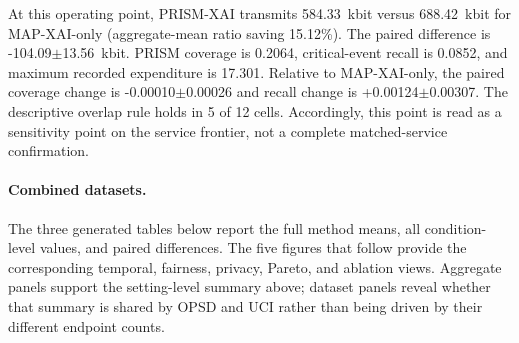 At this operating point, PRISM-XAI transmits 584.33~kbit versus 688.42~kbit for MAP-XAI-only (aggregate-mean ratio saving 15.12\%). The paired difference is -104.09$\pm$13.56~kbit. PRISM coverage is 0.2064, critical-event recall is 0.0852, and maximum recorded expenditure is 17.301. Relative to MAP-XAI-only, the paired coverage change is -0.00010$\pm$0.00026 and recall change is +0.00124$\pm$0.00307. The descriptive overlap rule holds in 5 of 12 cells. Accordingly, this point is read as a sensitivity point on the service frontier, not a complete matched-service confirmation.

\paragraph{Combined datasets.} The three generated tables below report the full method means, all condition-level values, and paired differences. The five figures that follow provide the corresponding temporal, fairness, privacy, Pareto, and ablation views. Aggregate panels support the setting-level summary above; dataset panels reveal whether that summary is shared by OPSD and UCI rather than being driven by their different endpoint counts.

\begin{table}[p]\centering\tiny

\caption{Public-score threshold $\tau=3$, release cap $M=32$, Combined datasets: complete generated method table.}

\label{tab:thr_3_cap_32:combined:main}

\resizebox{\linewidth}{!}{}

\end{table}\clearpage

\begin{table}[p]\centering\tiny

\caption{Public-score threshold $\tau=3$, release cap $M=32$, Combined datasets: complete condition-level generated table.}

\label{tab:thr_3_cap_32:combined:conditions}

\resizebox{\textwidth}{!}{}

\end{table}\clearpage

\begin{table}[p]\centering\tiny

\caption{Public-score threshold $\tau=3$, release cap $M=32$, Combined datasets: complete generated paired comparisons.}

\label{tab:thr_3_cap_32:combined:paired}

\resizebox{\textwidth}{!}{}

\end{table}\clearpage

